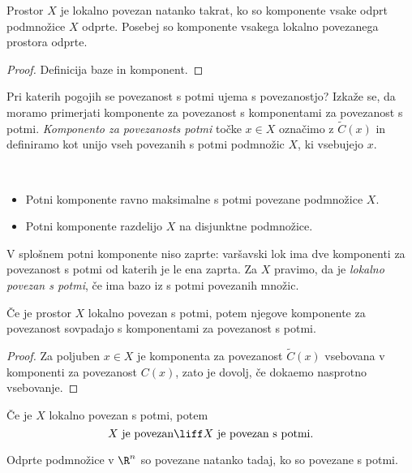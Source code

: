 \begin{trditev}
    Prostor $X$ je lokalno povezan natanko takrat, ko so komponente vsake odprt podmnožice $X$ odprte. Posebej so komponente vsakega lokalno povezanega prostora odprte.
\end{trditev}

\begin{proof}
    Definicija baze in komponent.
\end{proof}

Pri katerih pogojih se povezanost s potmi ujema s povezanostjo? Izkaže se, da moramo primerjati komponente za povezanost s komponentami za povezanost s potmi. \emph{Komponento za povezanosts potmi} točke $x \in X$ označimo z $\widetilde{C}(x)$ in definiramo kot unijo vseh povezanih s potmi podmnožic $X$, ki vsebujejo $x$.

\begin{opomba}
    \ 
    \begin{itemize}
        \item Potni komponente ravno maksimalne s potmi povezane podmnožice $X$.
        \item Potni komponente razdelijo $X$ na disjunktne podmnožice.
    \end{itemize}

    V splošnem potni komponente niso zaprte: varšavski lok ima dve komponenti za povezanost s potmi od katerih je le ena zaprta. Za $X$ pravimo, da je \emph{lokalno povezan s potmi}, če ima bazo iz s potmi povezanih množic.
\end{opomba}

\begin{izrek}
    Če je prostor $X$ lokalno povezan s potmi, potem njegove komponente za povezanost sovpadajo s komponentami za povezanost s potmi.
\end{izrek}

\begin{proof}
    Za poljuben $x \in X$ je komponenta za povezanost $\widetilde{C}(x)$ vsebovana v komponenti za povezanost $C(x)$, zato je dovolj, če dokaemo nasprotno vsebovanje.
\end{proof}

\newpage
\begin{posledica}
    Če je $X$ lokalno povezan s potmi, potem 
    $$X \text{ je povezan} \liff X \text{ je povezan s potmi}.$$
\end{posledica}

\begin{posledica}
    Odprte podmnožice v $\R^n$ so povezane natanko tadaj, ko so povezane s potmi.
\end{posledica}

